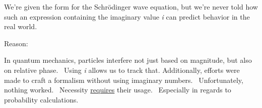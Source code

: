 We're given the form for the Schrödinger wave equation, but we're never told
how such an expression containing the imaginary value \textit{i} can predict
behavior in the real world.

Reason:

In quantum mechanics, particles interfere not just based on magnitude, but also
on relative phase. \ Using \textit{i} allows us to track that.
Additionally, efforts were made to craft a formalism without using
imaginary numbers. \ Unfortunately, nothing worked. \ Necessity
\underline{requires} their usage. \ Especially in regards to probability
calculations.
